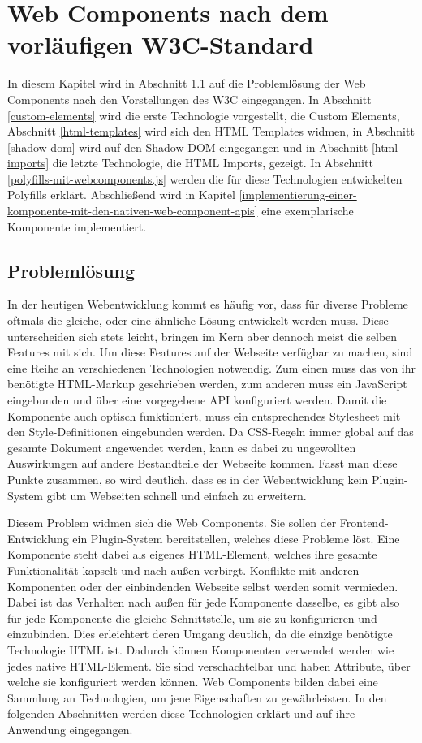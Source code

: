 \chapter{Web Components nach dem vorläufigen W3C-Standard}\label{web-components-nach-w3c}

In diesem Kapitel wird in Abschnitt \ref{problemloesung} auf die Problemlösung der Web Components nach den Vorstellungen des \ac{W3C} eingegangen. In Abschnitt \ref{custom-elements} wird die erste Technologie vorgestellt, die Custom Elements, Abschnitt \ref{html-templates} wird sich den \ac{HTML} Templates widmen, in Abschnitt \ref{shadow-dom} wird auf den Shadow \ac{DOM} eingegangen und in Abschnitt \ref{html-imports} die letzte Technologie, die \ac{HTML} Imports, gezeigt. In Abschnitt \ref{polyfills-mit-webcomponents.js} werden die für diese Technologien entwickelten Polyfills erklärt. Abschließend wird in Kapitel \ref{implementierung-einer-komponente-mit-den-nativen-web-component-apis} eine exemplarische Komponente implementiert.


\section{Problemlösung}\label{problemloesung}

In der heutigen Webentwicklung kommt es häufig vor, dass für diverse Probleme oftmals die gleiche, oder eine ähnliche Lösung entwickelt werden muss. Diese unterscheiden sich stets leicht, bringen im Kern aber dennoch meist die selben Features mit sich. Um diese Features auf der Webseite verfügbar zu machen, sind eine Reihe an verschiedenen Technologien notwendig. Zum einen muss das von ihr benötigte \ac{HTML}-Markup geschrieben werden, zum anderen muss ein JavaScript eingebunden und über eine vorgegebene \ac{API} konfiguriert werden. Damit die Komponente auch optisch funktioniert, muss ein entsprechendes Style\-sheet mit den Style-Definitionen eingebunden werden. Da \ac{CSS}-Regeln immer global auf das gesamte Dokument angewendet werden, kann es dabei zu ungewollten Auswirkungen auf andere Bestandteile der Webseite kommen. Fasst man diese Punkte zusammen, so wird deutlich, dass es in der Webentwicklung kein Plugin-System gibt um Webseiten schnell und einfach zu erweitern.

Diesem Problem widmen sich die Web Components. Sie sollen der Frontend-Ent\-wick\-lung ein Plugin-System bereitstellen, welches diese Probleme löst. Eine Komponente steht dabei als eigenes \ac{HTML}-Element, welches ihre gesamte Funktionalität kapselt und nach außen verbirgt. Konflikte mit anderen Komponenten oder der einbindenden Webseite selbst werden somit vermieden. Dabei ist das Verhalten nach außen für jede Komponente dasselbe, es gibt also für jede Komponente die gleiche Schnittstelle, um sie zu konfigurieren und einzubinden. Dies erleichtert deren Umgang deutlich, da die einzige benötigte Technologie \ac{HTML} ist. Dadurch können Komponenten verwendet werden wie jedes native \ac{HTML}-Element. Sie sind verschachtelbar und haben Attribute, über welche sie konfiguriert werden können. Web Components bilden dabei eine Sammlung an Technologien, um jene Eigenschaften zu gewährleisten. In den folgenden Abschnitten werden diese Technologien erklärt und auf ihre Anwendung eingegangen.
